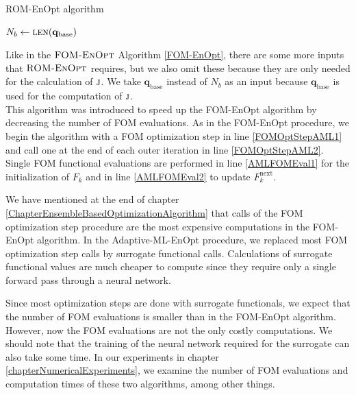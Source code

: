 \begin{algorithm}[H]%
\caption{\label{ROM-EnOpt}ROM-EnOpt algorithm}
\begin{algorithmic}[1]
\State $N_b\gets \Call{len}{\mathbf{q}_\mathrm{base}}$
\State \Return {}
\EndFunction
\end{algorithmic}
\end{algorithm}

Like in the $\textproc{FOM-EnOpt}$ Algorithm \ref{FOM-EnOpt}, there are some more inputs that $\textproc{ROM-EnOpt}$ requires, but we also omit these because they are only needed for the calculation of $\textproc{j}$. We take $\mathbf{q}_\mathrm{base}$ instead of $N_b$ as an input because $\mathbf{q}_\mathrm{base}$ is used for the computation of $\textproc{j}$.\\

This algorithm was introduced to speed up the FOM-EnOpt algorithm by decreasing the number of FOM evaluations. As in the FOM-EnOpt procedure, we begin the algorithm with a FOM optimization step in line \ref{FOMOptStepAML1} and call one at the end of each outer iteration in line \ref{FOMOptStepAML2}. Single FOM functional evaluations are performed in line \ref{AMLFOMEval1} for the initialization of $F_k$ and in line \ref{AMLFOMEval2} to update $F^\mathrm{next}_k$.

We have mentioned at the end of chapter \ref{ChapterEnsembleBasedOptimizationAlgorithm} that calls of the FOM optimization step procedure are the most expensive computations in the FOM-EnOpt algorithm. In the Adaptive-ML-EnOpt procedure, we replaced most FOM optimization step calls by surrogate functional calls. Calculations of surrogate functional values are much cheaper to compute since they require only a single forward pass through a neural network.

Since most optimization steps are done with surrogate functionals, we expect that the number of FOM evaluations is smaller than in the FOM-EnOpt algorithm. However, now the FOM evaluations are not the only costly computations. We should note that the training of the neural network required for the surrogate can also take some time. In our experiments in chapter \ref{chapterNumericalExperiments}, we examine the number of FOM evaluations and computation times of these two algorithms, among other things.